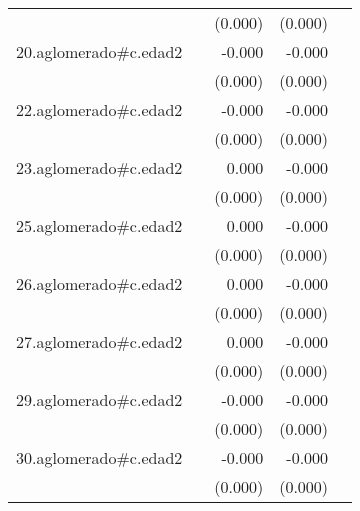 {\begin{longtable}{l*{4}{D{.}{.}{-1}}}
            &                     &     (0.000)         &     (0.000)         &                     \\
\addlinespace
20.aglomerado#c.edad2&                     &      -0.000         &      -0.000\sym{*}  &                     \\
            &                     &     (0.000)         &     (0.000)         &                     \\
\addlinespace
22.aglomerado#c.edad2&                     &      -0.000         &      -0.000\sym{*}  &                     \\
            &                     &     (0.000)         &     (0.000)         &                     \\
\addlinespace
23.aglomerado#c.edad2&                     &       0.000         &      -0.000         &                     \\
            &                     &     (0.000)         &     (0.000)         &                     \\
\addlinespace
25.aglomerado#c.edad2&                     &       0.000         &      -0.000         &                     \\
            &                     &     (0.000)         &     (0.000)         &                     \\
\addlinespace
26.aglomerado#c.edad2&                     &       0.000         &      -0.000\sym{*}  &                     \\
            &                     &     (0.000)         &     (0.000)         &                     \\
\addlinespace
27.aglomerado#c.edad2&                     &       0.000         &      -0.000\sym{*}  &                     \\
            &                     &     (0.000)         &     (0.000)         &                     \\
\addlinespace
29.aglomerado#c.edad2&                     &      -0.000         &      -0.000\sym{**} &                     \\
            &                     &     (0.000)         &     (0.000)         &                     \\
\addlinespace
30.aglomerado#c.edad2&                     &      -0.000         &      -0.000\sym{***}&                     \\
            &                     &     (0.000)         &     (0.000)         &                     \\

\end{longtable}}
